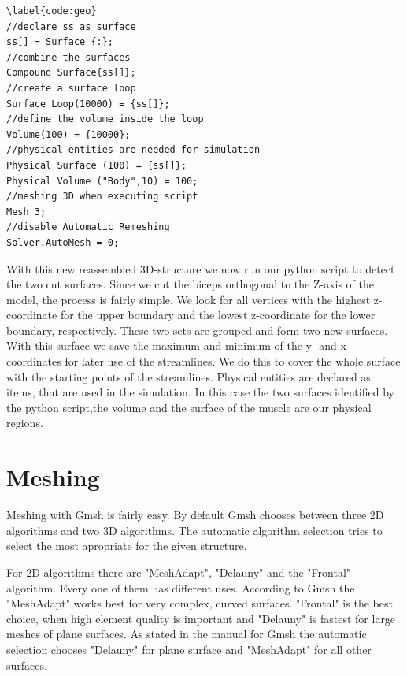 \documentclass[preprint,journal]{vgtc}       %
\begin{document}
\begin{verbatim}
\label{code:geo}
//declare ss as surface
ss[] = Surface {:};
//combine the surfaces
Compound Surface{ss[]};
//create a surface loop
Surface Loop(10000) = {ss[]};
//define the volume inside the loop
Volume(100) = {10000};
//physical entities are needed for simulation
Physical Surface (100) = {ss[]};
Physical Volume ("Body",10) = 100;
//meshing 3D when executing script
Mesh 3;
//disable Automatic Remeshing
Solver.AutoMesh = 0;
\end{verbatim}

With this new reassembled 3D-structure we now run our python script to detect the two cut surfaces. 
Since we cut the biceps orthogonal to the Z-axis of the model, the process is fairly simple.
We look for all vertices with the highest z-coordinate for the upper boundary and the lowest z-coordinate for the lower boundary, respectively.
These two sets are grouped and form two new surfaces. 
With this surface we save the maximum and minimum of the y- and x- coordinates for later use of the streamlines. 
We do this to cover the whole surface with the starting points of the streamlines.
Physical entities are declared as items, that are used in the simulation. 
In this case the two surfaces identified by the python script,the volume and the surface of the muscle are our physical regions. 

\section{Meshing}
Meshing with Gmsh is fairly easy. 
By default Gmsh chooses between three 2D algorithms and two 3D algorithms.
The automatic algorithm selection tries to select the most apropriate for the given structure.

For 2D algorithms there are "MeshAdapt", "Delauny" and the "Frontal" algorithm.
Every one of them has different uses. 
According to Gmsh the "MeshAdapt" works best for very complex, curved surfaces.
"Frontal" is the best choice, when high element quality is important and "Delauny" is fastest for large meshes of plane surfaces.
As stated in the manual for Gmsh the automatic selection chooses "Delauny" for plane surface and "MeshAdapt" for all other surfaces. 
\end{document}
